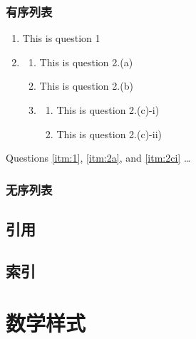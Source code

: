     \subsubsection{有序列表}
    \begin{enumerate}[ref=\theenumi.]
        \item This is question 1 \label{itm:1} 
        \item \begin{enumerate}[label=(\alph*),
                                ref=\theenumi(\theenumii)]
              \item This is question 2.(a) \label{itm:2a} 
              \item This is question 2.(b)
              \item \begin{enumerate}[label=-\roman*),
                                      ref=\theenumii-\theenumiii)]
                    \item This is question 2.(c)-i) \label{itm:2ci}
                    \item This is question 2.(c)-ii)
                    \end{enumerate}
              \end{enumerate}
        \end{enumerate}
        
        Questions \ref{itm:1}, \ref{itm:2a}, and \ref{itm:2ci} \dots
    \subsubsection{无序列表}
\subsection{引用}
\subsection{索引}
\clearpage
\section[数学样式]{数学样式}
